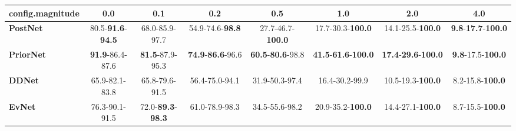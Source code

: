 \begin{tabular}{lccccccc}
\toprule
\textbf{config.magnitude} &                               0.0 &                               0.1 &                               0.2 &                               0.5 &                                         1.0 &                                         2.0 &                                        4.0 \\
\midrule
\textbf{PostNet } &  80.5-\textbf{91.6}-\textbf{94.5} &                    68.0-85.9-97.7 &           54.9-74.6-\textbf{98.8} &          27.7-46.7-\textbf{100.0} &                    17.7-30.3-\textbf{100.0} &                    14.1-25.5-\textbf{100.0} &  \textbf{9.8}-\textbf{17.7}-\textbf{100.0} \\
\textbf{PriorNet} &           \textbf{91.9}-86.4-87.6 &           \textbf{81.5}-87.9-95.3 &  \textbf{74.9}-\textbf{86.6}-96.6 &  \textbf{60.5}-\textbf{80.6}-98.8 &  \textbf{41.5}-\textbf{61.6}-\textbf{100.0} &  \textbf{17.4}-\textbf{29.6}-\textbf{100.0} &           \textbf{9.8}-17.5-\textbf{100.0} \\
\textbf{DDNet   } &                    65.9-82.1-83.8 &                    65.8-79.6-91.5 &                    56.4-75.0-94.1 &                    31.9-50.3-97.4 &                              16.4-30.2-99.9 &                    10.5-19.3-\textbf{100.0} &                    8.2-15.8-\textbf{100.0} \\
\textbf{EvNet   } &                    76.3-90.1-91.5 &  72.0-\textbf{89.3}-\textbf{98.3} &                    61.0-78.9-98.3 &                    34.5-55.6-98.2 &                    20.9-35.2-\textbf{100.0} &                    14.4-27.1-\textbf{100.0} &                    8.7-15.5-\textbf{100.0} \\
\bottomrule
\end{tabular}
